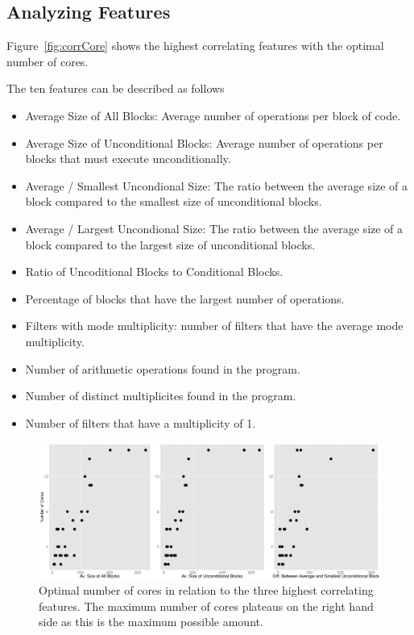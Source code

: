 \subsection{Analyzing Features}

Figure~\ref{fig:corrCore} shows the highest correlating features with the optimal number of cores.

The ten features can be described as follows
\begin{itemize}
\item Average Size of All Blocks: Average number of operations per block of code.
\item Average Size of Unconditional Blocks: Average number of operations per blocks that must execute unconditionally.
\item Average / Smallest Uncondional Size: The ratio between the average size of a block compared to the smallest size of unconditional blocks.
\item Average / Largest Uncondional Size: The ratio between the average size of a block compared to the largest size of unconditional blocks.
\item Ratio of Uncoditional Blocks to Conditional Blocks.
\item Percentage of blocks that have the largest number of operations.
\item Filters with mode multiplicity: number of filters that have the average mode multiplicity.
\item Number of arithmetic operations found in the program.
\item Number of distinct multiplicites found in the program.
\item Number of filters that have a multiplicity of 1.
\end{itemize}

\begin{figure}[h]
  \center
  \includegraphics[width=1\textwidth]{streamit-paper/graphics/lineargraphs.pdf}
  \caption{Optimal number of cores in relation to the three highest correlating features. The maximum number of cores plateaus on the right hand side as this is the maximum possible amount.}\label{fig:maxav}
\end{figure}

